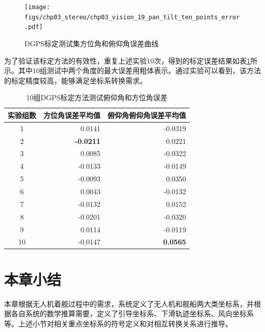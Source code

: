 \begin{figure}[htb]
	\centering
	\texttt{[image: figs/chp03\_stereo/chp03\_vision\_19\_pan\_tilt\_ten\_points\_error.pdf]}	
	\caption{DGPS标定测试集方位角和俯仰角误差曲线}
	\label{fig:chp03_vision_19_pan_tilt_ten_points_error}
\end{figure}

为了验证该标定方法的有效性，重复上述实验10次，得到的标定误差结果如表\ref{label:DGPS_10_Test_Results}所示。其中10组测试中两个角度的最大误差用粗体表示。通过实验可以看到，该方法的标定精度较高，能够满足坐标系转换需求。
\begin{table}[htb]
	\centering
	\caption{10组DGPS标定方法测试俯仰角和方位角误差}
	\label{label:DGPS_10_Test_Results}
	\begin{tabular}{crr}
		\hline
		实验组数 & \multicolumn{1}{c}{方位角误差平均值} & \multicolumn{1}{c}{俯仰角俯仰角误差平均值} \\ \hline
		1    & 0.0141                       & -0.0319                         \\
		2    & \textbf{-0.0211}             & 0.0221                          \\
		3    & 0.0085                       & -0.0322                \\
		4    & -0.0133                      & -0.0149                         \\
		5    & -0.0093                      & 0.0350                          \\
		6    & 0.0043                       & -0.0132                         \\
		7    & -0.0132                      & 0.0152                          \\
		8    & -0.0201                      & -0.0320                         \\
		9    & 0.0114                       & -0.0119                         \\
		10   & -0.0147                      & \textbf{0.0565}                          \\ \hline
	\end{tabular}
\end{table}




\section{本章小结}
本章根据无人机着舰过程中的需求，系统定义了无人机和舰船两大类坐标系，并根据各自系统的数学推算需要，定义了引导坐标系、下滑轨迹坐标系、风向坐标系等。上述小节对相关重点坐标系的符号定义和对相互转换关系进行推导。




